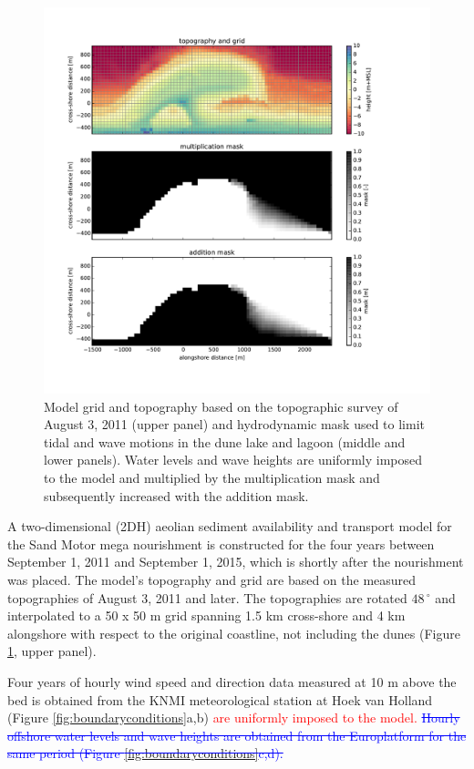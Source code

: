 \begin{figure}
  \centering
  \includegraphics[width=\columnwidth]{../Figures/gridmask}
  \caption{Model grid and topography based on the topographic survey
    of August 3, 2011 (upper panel) and hydrodynamic mask used to
    limit tidal and wave motions in the dune lake and lagoon (middle
    and lower panels). Water levels and wave heights are uniformly
    imposed to the model and multiplied by the multiplication mask and
    subsequently increased with the addition mask.}
  \label{fig:gridmask}
\end{figure}

A two-dimensional (2DH) aeolian sediment availability and transport
model for the Sand Motor mega nourishment is constructed for the four
years between September 1, 2011 and September 1, 2015, which is
shortly after the nourishment was placed. The model's topography and
grid are based on the measured topographies of August 3, 2011 and
later. The topographies are rotated $48\,^{\circ}$ and interpolated to
a 50 x 50 m grid spanning 1.5 km cross-shore and 4 km alongshore with
respect to the original coastline, not including the dunes (Figure
\ref{fig:gridmask}, upper panel).

Four years of hourly wind speed and direction data measured at 10 m
above the bed is obtained from the KNMI meteorological station at Hoek
van Holland (Figure \ref{fig:boundaryconditions}a,b)
\textcolor{red}{are uniformly imposed to the model.}
\textcolor{blue}{\sout{Hourly offshore water levels and wave heights
    are obtained from the Europlatform for the same period (Figure
    \ref{fig:boundaryconditions}c,d).}}


